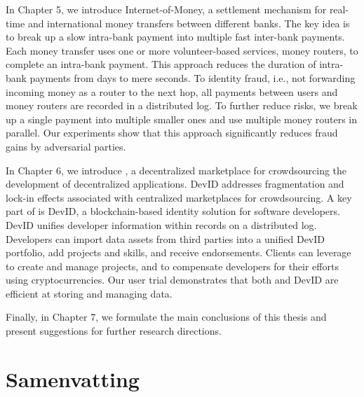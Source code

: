 In Chapter 5, we introduce Internet-of-Money, a settlement mechanism for real-time and international money transfers between different banks.
The key idea is to break up a slow intra-bank payment into multiple fast inter-bank payments.
Each money transfer uses one or more volunteer-based services, money routers, to complete an intra-bank payment.
This approach reduces the duration of intra-bank payments from days to mere seconds.
To identity fraud, i.e., not forwarding incoming money as a router to the next hop, all payments between users and money routers are recorded in a distributed log.
To further reduce risks, we break up a single payment into multiple smaller ones and use multiple money routers in parallel.
Our experiments show that this approach significantly reduces fraud gains by adversarial parties.

In Chapter 6, we introduce \Dappcoder{}, a decentralized marketplace for crowdsourcing the development of decentralized applications.
DevID addresses fragmentation and lock-in effects associated with centralized marketplaces for crowdsourcing.
A key part of \Dappcoder{} is DevID, a blockchain-based identity solution for software developers.
DevID unifies developer information within records on a distributed log.
Developers can import data assets from third parties into a unified DevID portfolio, add projects and skills, and receive endorsements.
Clients can leverage \Dappcoder{} to create and manage projects, and to compensate developers for their efforts using cryptocurrencies.
Our user trial demonstrates that both \Dappcoder{} and DevID are efficient at storing and managing data.

Finally, in Chapter 7, we formulate the main conclusions of this thesis and present suggestions for further research directions.

\chapter*{Samenvatting}

